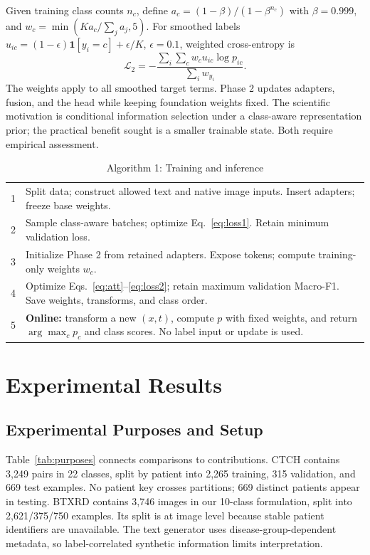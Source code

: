 \documentclass[conference,a4paper]{IEEEtran}
\begin{document}
Given training class counts $n_c$, define $a_c=(1-\beta)/(1-\beta^{n_c})$ with $\beta=0.999$, and $w_c=\min(Ka_c/\sum_j a_j,5)$. For smoothed labels $u_{ic}=(1-\epsilon)\mathbf1[y_i=c]+\epsilon/K$, $\epsilon=0.1$, weighted cross-entropy is
\begin{equation}
\mathcal L_2=-\frac{\sum_i\sum_c w_cu_{ic}\log p_{ic}}
{\sum_i w_{y_i}}.
\label{eq:loss2}
\end{equation}
The weights apply to all smoothed target terms. Phase 2 updates adapters, fusion, and the head while keeping foundation weights fixed. The scientific motivation is conditional information selection under a class-aware representation prior; the practical benefit sought is a smaller trainable state. Both require empirical assessment.

\begin{table}[t]
\caption{Algorithm 1: Training and inference}
\label{alg:procedure}
\footnotesize
\begin{tabularx}{\columnwidth}{@{}rY@{}}
 & Split data; construct allowed text and native image inputs. Insert adapters; freeze base weights. \\
2 & Sample class-aware batches; optimize Eq.~\eqref{eq:loss1}. Retain minimum validation loss. \\
3 & Initialize Phase 2 from retained adapters. Expose tokens; compute training-only weights $w_c$. \\
4 & Optimize Eqs.~\eqref{eq:att}--\eqref{eq:loss2}; retain maximum validation Macro-F1. Save weights, transforms, and class order. \\
5 & \textbf{Online:} transform a new $(x,t)$, compute $p$ with fixed weights, and return $\arg\max_c p_c$ and class scores. No label input or update is used. \\
\bottomrule
\end{tabularx}
\end{table}

\section{Experimental Results}
\subsection{Experimental Purposes and Setup}
Table~\ref{tab:purposes} connects comparisons to contributions. CTCH contains 3,249 pairs in 22 classes, split by patient into 2,265 training, 315 validation, and 669 test examples. No patient key crosses partitions; 669 distinct patients appear in testing. BTXRD \cite{Yao2025} contains 3,746 images in our 10-class formulation, split into 2,621/375/750 examples. Its split is at image level because stable patient identifiers are unavailable. The text generator uses disease-group-dependent metadata, so label-correlated synthetic information limits interpretation.
\end{document}
